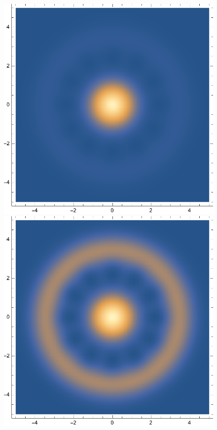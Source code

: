 \documentclass{article}
\theoremstyle{definition}
\begin{document}
\begin{enumerate}[label=\alph*)]
\begin{figure}[!htb]
\begin{minipage}{.24\textwidth}
	\end{minipage}%
	\begin{minipage}{.24\textwidth}
  	\centering
  	\includegraphics[width=.7\linewidth]{figures/1-phi-pi-theta-pi3.eps}
	\end{minipage}
	\begin{minipage}{.24\textwidth}
  	\centering
  	\includegraphics[width=.7\linewidth]{figures/1-phi-pi-theta-2pi3.eps}
	\end{minipage}
	\begin{minipage}{.24\textwidth}
  	\centering

\end{minipage}
\end{figure}
\end{enumerate}
\end{document}

